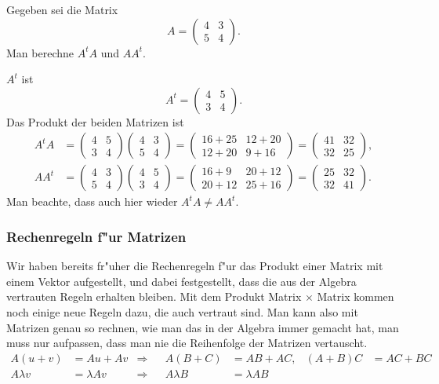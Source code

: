 \begin{beispiel}
Gegeben sei die Matrix
\[
A=\begin{pmatrix}
4&3\\
5&4
\end{pmatrix}.
\]
Man berechne $A^tA$ und $AA^t$.

\smallskip

{\parindent 0pt $A^t$ ist}
\[
A^t=\begin{pmatrix}
4&5\\
3&4
\end{pmatrix}.
\]
Das Produkt der beiden Matrizen ist
\begin{align*}
A^tA&=
\begin{pmatrix}
4&5\\
3&4
\end{pmatrix}
\begin{pmatrix}
4&3\\
5&4
\end{pmatrix}
=\begin{pmatrix}
16+25&12+20\\
12+20&9+16
\end{pmatrix}
=
\begin{pmatrix}
41&32\\
32&25
\end{pmatrix},
\\
AA^t&=
\begin{pmatrix}
4&3\\
5&4
\end{pmatrix}
\begin{pmatrix}
4&5\\
3&4
\end{pmatrix}
=
\begin{pmatrix}
16+9&20+12\\
20+12&25+16
\end{pmatrix}
=
\begin{pmatrix}
25&32\\
32&41
\end{pmatrix}.
\end{align*}
Man beachte, dass auch hier wieder $A^tA\ne AA^t$.
\end{beispiel}

\subsubsection{Rechenregeln f"ur Matrizen}
Wir haben bereits fr"uher die Rechenregeln f"ur das Produkt einer Matrix
mit einem Vektor aufgestellt, und dabei festgestellt, dass die
aus der Algebra vertrauten Regeln erhalten bleiben.
Mit dem
Produkt Matrix $\times$ Matrix kommen noch einige neue Regeln dazu,
die auch vertraut sind. Man kann also mit Matrizen genau so rechnen,
wie man das in der Algebra immer gemacht hat, man muss nur
aufpassen, dass man nie die Reihenfolge der Matrizen vertauscht.
\begin{align*}
    A(u+v)&=Au+Av     &\Rightarrow&&A(B+C)&=AB+AC,    &(A+B)C&=AC+BC\\
A\lambda v&=\lambda Av&\Rightarrow&&A\lambda B&=\lambda AB
\end{align*}

